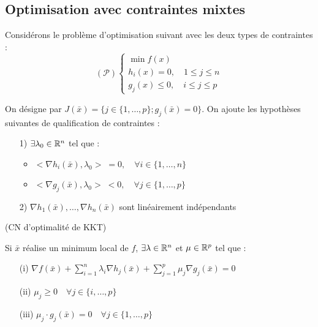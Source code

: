 \subsection{Optimisation avec contraintes mixtes}

Considérons le problème d'optimisation suivant avec les deux types de contraintes : \[ (\mathcal{P}) \begin{cases}\min f(x) \\ h_i(x) = 0 , \quad 1 \leq j \leq n \\ g_j(x) \leq 0 , \quad i \leq j \leq p \end{cases} \]

On désigne par $J(\bar{x})=\{j \in \{1, \dots , p\}; g_j(\bar{x}) = 0\}$.
On ajoute les hypothèses suivantes de qualification de contraintes :
\begin{itemize}
	\item[1)] $\exists \lambda_0 \in \mathbb{R}^n$ tel que :
	\begin{itemize}
		\item $<\nabla h_i(\bar{x}), \lambda_0> \; = 0, \quad \forall i \in \{ 1, \dots , n \}$
		\item $<\nabla g_j(\bar{x}), \lambda_0> \; < 0, \quad \forall j \in \{ 1, \dots , p \}$
	\end{itemize}
	\item[2)] $\nabla h_1(\bar{x}), \dots, \nabla h_n(\bar{x})$ sont linéairement indépendants
\end{itemize}

\begin{theoreme} (CN d'optimalité de KKT)

Si $\bar{x}$ réalise un minimum local de $f$, $\exists \lambda \in \mathbb{R}^n$ et $\mu \in \mathbb{R}^p$ tel que :
	\begin{itemize}
		\item[(i)] $\displaystyle \nabla f(\bar{x}) + \sum_{i=1}^n \lambda _i \nabla h_j (\bar{x}) + \sum_{j=1}^p \mu _j \nabla g_j (\bar{x}) = 0$
		\item[(ii)] $ \mu _j \geq 0 \quad \forall j \in \{ i, \dots , p \}$
		\item[(iii)] $ \mu _j \cdot g_j(\bar{x}) = 0 \quad \forall j \in \{ 1, \dots , p \}$
	\end{itemize}
\end{theoreme}

